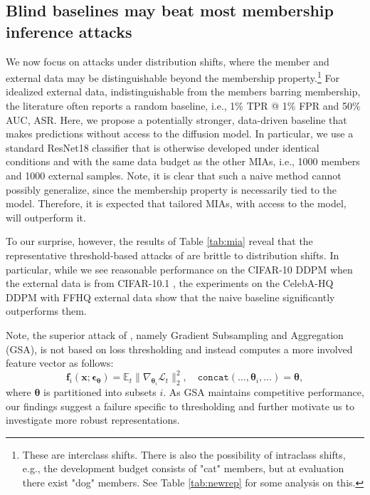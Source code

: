 \documentclass{article}
\theoremstyle{remark}
\begin{document}
\subsection{Blind baselines may beat most membership inference attacks}
\label{subsec:blindbeat}

We now focus on attacks under distribution shifts, where the member and external data may be distinguishable beyond the membership property.\footnote{These are interclass shifts. There is also the possibility of intraclass shifts, e.g., the development budget consists of "cat" members, but at evaluation there exist "dog" members. See Table \ref{tab:newrep} for some analysis on this.} For idealized external data, indistinguishable from the members barring membership, the literature often reports a random baseline, i.e., 1\% TPR @ 1\% FPR and 50\% AUC, ASR. Here, we propose a potentially stronger, data-driven baseline that makes predictions without access to the diffusion model. In particular, we use a standard ResNet18 \citep{He_2016_CVPR} classifier that is otherwise developed under identical conditions and with the same data budget as the other MIAs, i.e., 1000 members and 1000 external samples. Note, it is clear that such a naive method cannot possibly generalize, since the membership property is necessarily tied to the model. Therefore, it is expected that tailored MIAs, with access to the model, will outperform it.

To our surprise, however, the results of Table \ref{tab:mia} reveal that the representative threshold-based attacks of \citet{10188618, kong2024an} are brittle to distribution shifts. In particular, while we see reasonable performance on the CIFAR-10 DDPM when the external data is from CIFAR-10.1 \citep{recht2018cifar10.1, torralba2008tinyimages}, the experiments on the CelebA-HQ DDPM with FFHQ \citep{Karras2018ASG} external data show that the naive baseline significantly outperforms them.

Note, the superior attack of \citet{pang2025whitebox}, namely Gradient Subsampling and Aggregation (GSA), is not based on loss thresholding and instead computes a more involved feature vector as follows:
\begin{equation}
    \boldsymbol{f}_i(\boldsymbol{x};\boldsymbol{\epsilon}_{\boldsymbol{\theta}})=\mathbb{E}_{t}\|\nabla_{\boldsymbol{\theta}_i}\mathcal{L}_t\|^2_2, \quad \texttt{concat}(\dots,\boldsymbol{\theta}_i,\dots)=\boldsymbol{\theta},
\end{equation}
where $\boldsymbol{\theta}$ is partitioned into subsets $i$. As GSA maintains competitive performance, our findings suggest a failure specific to thresholding and further motivate us to investigate more robust representations.
\end{document}
